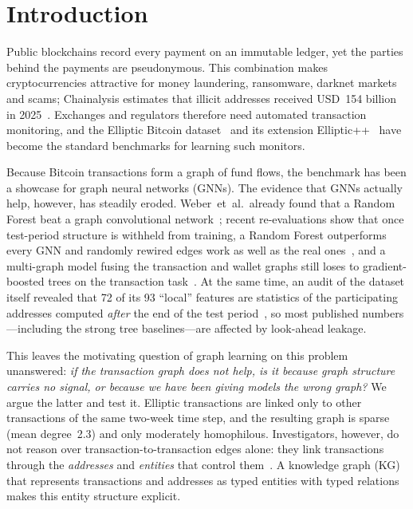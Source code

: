 \section{Introduction}\label{sec:intro}

Public blockchains record every payment on an immutable ledger, yet the
parties behind the payments are pseudonymous. This combination makes
cryptocurrencies attractive for money laundering, ransomware, darknet markets
and scams; Chainalysis estimates that illicit addresses received
USD~154 billion in 2025~\cite{chainalysis2026}. Exchanges and regulators
therefore need automated transaction monitoring, and the Elliptic Bitcoin
dataset~\cite{weber2019} and its extension Elliptic++~\cite{elmougy2023} have
become the standard benchmarks for learning such monitors.

Because Bitcoin transactions form a graph of fund flows, the benchmark has been
a showcase for graph neural networks (GNNs). The evidence that GNNs actually
help, however, has steadily eroded. Weber~et~al.\ already found that a Random
Forest beat a graph convolutional network~\cite{weber2019}; recent
re-evaluations show that once test-period structure is withheld from training,
a Random Forest outperforms every GNN and randomly rewired edges work as well as
the real ones~\cite{maganti2026}, and a multi-graph model fusing the
transaction and wallet graphs still loses to gradient-boosted trees on the
transaction task~\cite{ichull2026twin}. At the same time, an audit of the
dataset itself revealed that 72 of its 93 ``local'' features are statistics of
the participating addresses computed \emph{after} the end of the test
period~\cite{safar2026}, so most published numbers---including the strong
tree baselines---are affected by look-ahead leakage.

This leaves the motivating question of graph learning on this problem
unanswered: \emph{if the transaction graph does not help, is it because graph
structure carries no signal, or because we have been giving models the wrong
graph?} We argue the latter and test it. Elliptic transactions are linked only
to other transactions of the same two-week time step, and the resulting graph
is sparse (mean degree~2.3) and only moderately homophilous. Investigators,
however, do not reason over transaction-to-transaction edges alone: they link
transactions through the \emph{addresses} and \emph{entities} that control
them~\cite{meiklejohn2013}. A knowledge graph (KG) that represents
transactions and addresses as typed entities with typed relations makes this
entity structure explicit.

